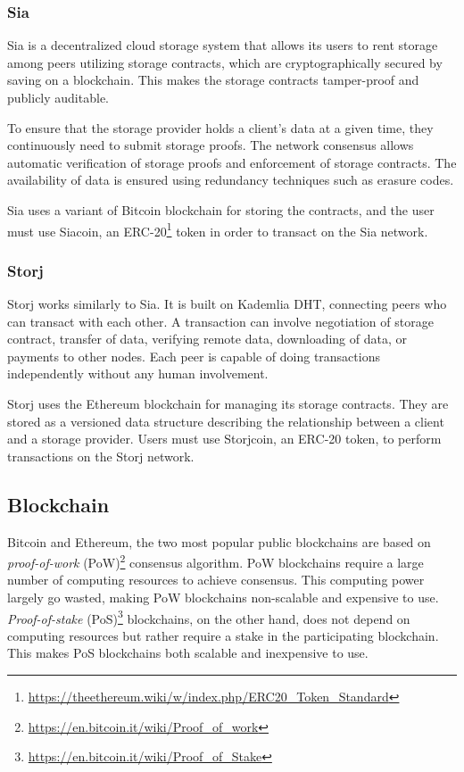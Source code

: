 \subsubsection{Sia}
Sia\cite{vorick2014sia} is a decentralized cloud storage system that allows its users to rent storage among peers utilizing storage contracts, which are cryptographically secured by saving on a blockchain. This makes the storage contracts tamper-proof and publicly auditable.

To ensure that the storage provider holds a client's data at a given time, they continuously need to submit storage proofs. The network consensus allows automatic verification of storage proofs and enforcement of storage contracts. The availability of data is ensured using redundancy techniques such as erasure codes.

Sia uses a variant of Bitcoin blockchain for storing the contracts, and the user must use Siacoin, an ERC-20\footnote{\url{https://theethereum.wiki/w/index.php/ERC20_Token_Standard}} token in order to transact on the Sia network.

\subsubsection{Storj}
Storj\cite{wilkinson2014storj} works similarly to Sia. It is built on Kademlia\cite{maymounkov2002kademlia} DHT, connecting peers who can transact with each other. A transaction can involve negotiation of storage contract, transfer of data, verifying remote data, downloading of data, or payments to other nodes. Each peer is capable of doing transactions independently without any human involvement.

Storj uses the Ethereum blockchain for managing its storage contracts. They are stored as a versioned data structure describing the relationship between a client and a storage provider. Users must use Storjcoin, an ERC-20 token, to perform transactions on the Storj network.

\subsection{Blockchain}
Bitcoin\cite{nakamoto2008bitcoin} and Ethereum\cite{buterin2014ethereum}, the two most popular public blockchains are based on \textit{proof-of-work} (PoW)\footnote{\url{https://en.bitcoin.it/wiki/Proof_of_work}} consensus algorithm. PoW blockchains require a large number of computing resources to achieve consensus. This computing power largely go wasted, making PoW blockchains non-scalable and expensive to use. \textit{Proof-of-stake} (PoS)\footnote{\url{https://en.bitcoin.it/wiki/Proof_of_Stake}} blockchains, on the other hand, does not depend on computing resources but rather require a stake in the participating blockchain. This makes PoS blockchains both scalable and inexpensive to use.

